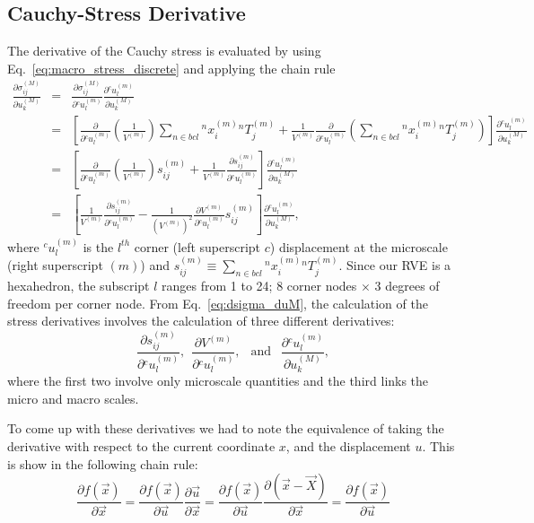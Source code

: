 \subsection{Cauchy-Stress Derivative}
%
The derivative of the Cauchy stress is evaluated by using Eq.\ \eqref{eq:macro_stress_discrete} and applying the chain rule
%
\begin{eqnarray}
\frac{\partial \sigma_{ij}^{(M)}}{\partial  u^{(M)}_k}  &=& \frac{\partial \sigma_{ij}^{(M)}}{\partial {}^c u_l^{(m)}} \frac{\partial {}^c u_l^{(m)}}{\partial u^{(M)}_k} \nonumber\\
%
&=& \left [ \frac{\partial}{\partial {}^c u^{(m)}_l}  \left(\frac{1}{V^{(m)}}\right) \sum_{n \in bcl} {}^nx_i^{(m)} {}^nT_j^{(m)}+ \frac{1}{V^{(m)}} \frac{\partial}{\partial {}^c u^{(m)}_l} \left(\sum_{n \in bcl} {}^nx_i^{(m)} {}^nT_j^{(m)} \right) \right] \frac{\partial {}^c u_l^{{(m)}}}{\partial u^{(M)}_k} \nonumber\\
%
&=&  \left[\frac{\partial}{\partial {}^c u^{(m)}_l}  \left(\frac{1}{V^{(m)}} \right)s_{ij}^{(m)} + \frac{1}{V^{(m)}} \frac{\partial s_{ij}^{(m)}}{\partial {}^c u^{(m)}_l}\right] \frac{\partial {}^c u_l^{{(m)}}}{\partial u^{(M)}_k} \nonumber\\
%
&=& \left[\frac{1}{V^{(m)}} \frac{\partial s_{ij}^{(m)}}{\partial {}^c u^{(m)}_l} -\frac{1}{(V^{(m)})^2}\frac{\partial V^{(m)}}{\partial {}^c u^{(m)}_l}s_{ij}^{(m)} \right] \frac{\partial {}^c u_l^{{(m)}}}{\partial u^{(M)}_k},
\label{eq:dsigma_duM}
\end{eqnarray}
%
where ${}^c u_l^{{(m)}}$ is the $l^{th}$ corner (left superscript $c$) displacement at the microscale (right superscript $(m)$) and $s_{ij}^{(m)} \equiv \sum_{n \in bcl} {}^n x^{(m)}_i {}^nT^{(m)}_j$. Since our RVE is a hexahedron, the subscript $l$ ranges from 1 to 24; 8 corner nodes $\times$ 3 degrees of freedom per corner node.  From Eq.\ \eqref{eq:dsigma_duM}, the calculation of the stress derivatives involves the calculation of three different derivatives:
%
\begin{equation}
\frac{\partial s_{ij}^{(m)}}{\partial {}^cu_l^{{(m)}} }, \ \
\frac{\partial V^{(m)}}{\partial {}^c u_l^{{(m)}}}, \ \ \text{ and } \ \ 
\frac{\partial {}^c u_l^{{(m)}}}{\partial u^{(M)}_k},
\end{equation}
%
where the first two involve only microscale quantities and the third links the micro and macro scales.

To come up with these derivatives we had to note the equivalence of taking the derivative with respect to the current coordinate \(x\), and the displacement \(u\). This is show in the following chain rule:
\begin{equation}
\frac{\partial f(\vec{x})}{\partial\vec{x}} = \frac{\partial f(\vec{x})}{\partial\vec{u}}\frac{\partial \vec{u}}{\partial\vec{x}} = \frac{\partial f(\vec{x})}{\partial \vec{u}}\frac{\partial (\vec{x}-\vec{X})}{\partial\vec{x}}=\frac{\partial f(\vec{x})}{\partial \vec{u}}
\end{equation}


